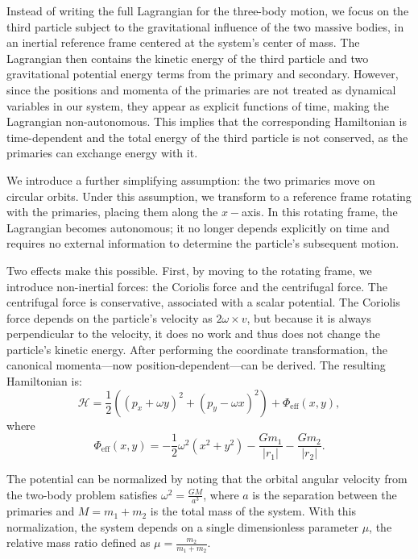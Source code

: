         Instead of writing the full Lagrangian for the three-body motion, we focus on the third particle subject to the gravitational influence of the two massive bodies, in an inertial reference frame centered at the system's center of mass. The Lagrangian then contains the kinetic energy of the third particle and two gravitational potential energy terms from the primary and secondary. However, since the positions and momenta of the primaries are not treated as dynamical variables in our system, they appear as explicit functions of time, making the Lagrangian non-autonomous. This implies that the corresponding Hamiltonian is time-dependent and the total energy of the third particle is not conserved, as the primaries can exchange energy with it.

        We introduce a further simplifying assumption: the two primaries move on circular orbits. Under this assumption, we transform to a reference frame rotating with the primaries, placing them along the $x-$axis. In this rotating frame, the Lagrangian becomes autonomous; it no longer depends explicitly on time and requires no external information to determine the particle's subsequent motion.

        Two effects make this possible. First, by moving to the rotating frame, we introduce non-inertial forces: the Coriolis force and the centrifugal force. The centrifugal force is conservative, associated with a scalar potential. The Coriolis force depends on the particle's velocity as $2\omega\times v$, but because it is always perpendicular to the velocity, it does no work and thus does not change the particle's kinetic energy. After performing the coordinate transformation, the canonical momenta—now position-dependent—can be derived. The resulting Hamiltonian is:
        \begin{equation}
            \mathcal{H} = \frac{1}{2}\left(\left(p_x + \omega y\right)^2 + \left(p_y - \omega x\right)^2 \right) + \Phi_\mathrm{eff}(x,y),
        \end{equation}
        where
        \begin{equation}
            \Phi_\mathrm{eff}(x,y) = -\frac{1}{2} \omega^2 (x^2 + y^2) - \frac{G m_1}{|r_1|} - \frac{G m_2}{|r_2|}.
        \end{equation}

        The potential can be normalized by noting that the orbital angular velocity from the two-body problem satisfies \(\omega^2 = \frac{G M}{a^3}\), where \(a\) is the separation between the primaries and \(M = m_1 + m_2\) is the total mass of the system. With this normalization, the system depends on a single dimensionless parameter \(\mu\), the relative mass ratio defined as \(\mu = \frac{m_2}{m_1 + m_2}\).

